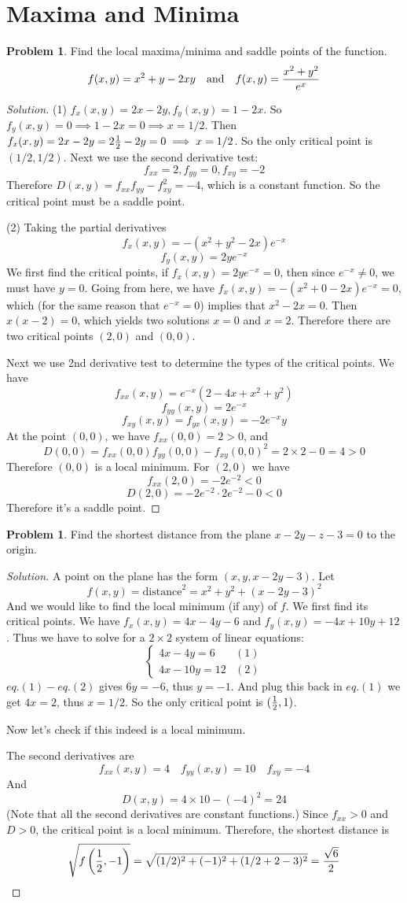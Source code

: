 \documentclass[12pt]{amsart}%
\theoremstyle{plain}
\theoremstyle{definition}
\newtheorem{prob}[theorem]{Problem}
\theoremstyle{special}
\newcommand{\sol}[1]{
{\begin{proof}[Solution]#1\end{proof}}
}
\newcommand{\Prob}[1]{\begin{tcolorbox}%
\begin{prob}
	#1
\end{prob}
\end{tcolorbox}	
}
\begin{document}
\section{Maxima and Minima}
\Prob{Find the local maxima/minima and saddle points of the function.
\[f(x,y)=x^2+y-2xy \quad\text{and}\quad f(x,y)={x^2+y^2\over e^x}\]}
\sol{(1) $f_x(x,y)=2x-2y,f_y(x,y)=1-2x$. So $f_y(x,y)=0\implies 1-2x=0\implies x=1/2$. Then $f_x(x,y)=2x-2y=2{1\over 2}-2y=0\implies x={1/2}$. So the only critical point is $(1/2,1/2)$.
Next we use the second derivative test:
\[f_{xx}=2,f_{yy}=0,f_{xy}=-2\]
Therefore $D(x,y)=f_{xx}f_{yy}-f_{xy}^2=-4$, which is a constant function. So the critical point must be a saddle point.

(2) Taking the partial derivatives
\[f_x(x,y)=-(x^2+y^2-2x)e^{-x}\]
\[f_y(x,y)=2ye^{-x}\]
We first find the critical points, if $f_x(x,y)=2ye^{-x}=0$, then since $e^{-x}\neq 0$, we must have $y=0$. Going from here, we have $f_x(x,y)=-(x^2+0-2x)e^{-x}=0$, which (for the same reason that $e^{-x}=0$) implies that $x^2-2x=0$. Then $x(x-2)=0$, which yields two solutions $x=0$ and $x=2$. Therefore there are two critical points $(2,0)$ and $(0,0)$.

Next we use 2nd derivative test to determine the types of the critical points. We have
\[f_{xx}(x,y)=e^{-x} (2 - 4 x + x^2 + y^2)\]
\[f_{yy}(x,y)=2e^{-x}\]
\[f_{xy}(x,y)=f_{yx}(x,y)=-2e^{-x}y\]
At the point $(0,0)$, we have
\(f_{xx}(0,0)=2>0\), and
\[D(0,0)=f_{xx}(0,0)f_{yy}(0,0)-f_{xy}(0,0)^2=2\times 2-0=4>0 \]
Therefore $(0,0)$ is a local minimum.
For $(2,0)$ we have
\[f_{xx}(2,0)=-2e^{-2}<0\]\[D(2,0)=-2e^{-2}\cdot 2e^{-2}-0<0\]
Therefore it's a saddle point.\qedhere
}
\Prob{Find the shortest distance from the plane $x-2y-z-3=0$ to the origin.}\sol{A point on the plane has the form $(x,y,x-2y-3)$.
Let
\[f(x,y)=\text{distance}^2=x^2+y^2+(x-2y-3)^2\]
And we would like to find the local minimum (if any) of $f$. We first find its critical points. We have
$f_x(x,y)=4x-4y-6$ and $f_y(x,y)=-4x+10y+12$. Thus we have to solve for a $2\times 2$ system of linear equations:
\[\begin{cases}
4x-4y=6&(1)\\4x-10y=12&(2)	
\end{cases}
\]
$eq.(1)-eq.(2)$ gives $6y=-6$, thus $y=-1$. And plug this back in $eq.(1)$ we get $4x=2$, thus $x=1/2$. So the only critical point is $({1\over 2},1)$. 

Now let's check if this indeed is a local minimum.

The second derivatives are
\[f_{xx}(x,y)=4\quad f_{yy}(x,y)=10\quad f_{xy}=-4\]
And 
\[D(x,y)=4\times 10-(-4)^2=24\]
(Note that all the second derivatives are constant functions.) Since $f_{xx}>0$ and $D>0$, the critical point is a local minimum. Therefore, the shortest distance is
\[\sqrt{f\left({1\over 2},-1\right)}=\sqrt{(1/2)^2+(-1)^2+(1/2+2-3)^2}={\sqrt{6}\over 2}\]
}
\end{document}
